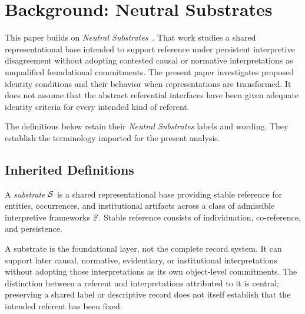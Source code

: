 
\section{Background: Neutral Substrates}
\label{sec:background}

This paper builds on \emph{Neutral Substrates}~\citep{case2026neutral}.
That work studies a shared representational base intended to support
reference under persistent interpretive disagreement without adopting
contested causal or normative interpretations as unqualified foundational
commitments.
The present paper investigates proposed identity conditions
and their behavior when representations are transformed.
It does not assume that the abstract referential interfaces
have been given adequate identity criteria for every intended kind of referent.

The definitions below retain their \emph{Neutral Substrates} labels and wording.
They establish the terminology imported for the present analysis.

\subsection{Inherited Definitions}
\label{subsec:ns-inherited-definitions}

\begin{definition}[Substrate]
  \label{se100.def.Substrate}
  A \emph{substrate} $\mathcal{S}$ is a shared representational base providing
  stable reference for entities, occurrences, and institutional artifacts
  across a class of admissible interpretive frameworks $\mathbb{F}$.
  Stable reference consists of individuation, co-reference, and persistence.
\end{definition}

A substrate is the foundational layer, not the complete record system.
It can support later causal, normative, evidentiary, or institutional
interpretations without adopting those interpretations as its own
object-level commitments.
The distinction between a referent and
interpretations attributed to it is central; preserving a shared label
or descriptive record does not itself establish that the intended
referent has been fixed.

